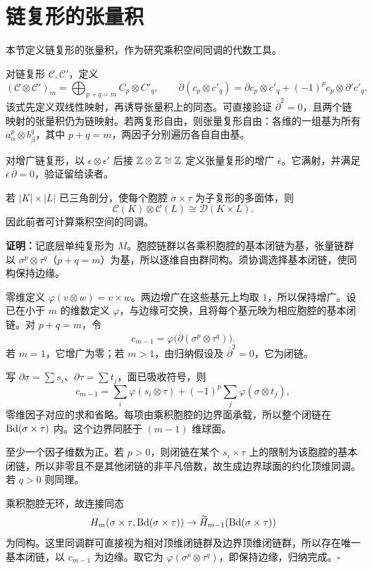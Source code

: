 \section{链复形的张量积}
本节定义链复形的张量积，作为研究乘积空间同调的代数工具。

对链复形 $\mathcal C,\mathcal C'$，定义
\[
(\mathcal C\otimes\mathcal C')_m=\bigoplus_{p+q=m}C_p\otimes C'_q,
\qquad
\overline\partial(c_p\otimes c'_q)=\partial c_p\otimes c'_q+(-1)^pc_p\otimes\partial'c'_q.
\]
该式先定义双线性映射，再诱导张量积上的同态。可直接验证 $\overline\partial^2=0$，且两个链映射的张量积仍为链映射。若两复形自由，则张量复形自由：各维的一组基为所有 $a_\alpha^p\otimes b_\beta^q$，其中 $p+q=m$，两因子分别遍历各自自由基。

对增广链复形，以 $\epsilon\otimes\epsilon'$ 后接 $\mathbb{Z}\otimes\mathbb{Z}\cong\mathbb{Z}$ 定义张量复形的增广 $\overline\epsilon$。它满射，并满足 $\overline\epsilon\,\overline\partial=0$，验证留给读者。

若 $|K|\times|L|$ 已三角剖分，使每个胞腔 $\sigma\times\tau$ 为子复形的多面体，则
\[
\mathcal C(K)\otimes\mathcal C(L)\cong\mathcal D(K\times L).
\]
因此前者可计算乘积空间的同调。

\textbf{证明：}记底层单纯复形为 $M$。胞腔链群以各乘积胞腔的基本闭链为基，张量链群以 $\sigma^p\otimes\tau^q$（$p+q=m$）为基，所以逐维自由群同构。须协调选择基本闭链，使同构保持边缘。

零维定义 $\varphi(v\otimes w)=v\times w$。两边增广在这些基元上均取 $1$，所以保持增广。设已在小于 $m$ 的维数定义 $\varphi$，与边缘可交换，且将每个基元映为相应胞腔的基本闭链。对 $p+q=m$，令
\[
c_{m-1}=\varphi\bigl(\overline\partial(\sigma^p\otimes\tau^q)\bigr).
\]
若 $m=1$，它增广为零；若 $m>1$，由归纳假设及 $\overline\partial^2=0$，它为闭链。

写 $\partial\sigma=\sum s_i$、$\partial\tau=\sum t_j$，面已吸收符号，则
\[
c_{m-1}=\sum_i\varphi(s_i\otimes\tau)+(-1)^p\sum_j\varphi(\sigma\otimes t_j),
\]
零维因子对应的求和省略。每项由乘积胞腔的边界面承载，所以整个闭链在 $\operatorname{Bd}(\sigma\times\tau)$ 内。这个边界同胚于 $(m-1)$ 维球面。

至少一个因子维数为正。若 $p>0$，则闭链在某个 $s_i\times\tau$ 上的限制为该胞腔的基本闭链，所以非零且不是其他闭链的非平凡倍数，故生成边界球面的约化顶维同调。若 $q>0$ 则同理。

乘积胞腔无环，故连接同态
\[
H_m(\sigma\times\tau,\operatorname{Bd}(\sigma\times\tau))\to\widetilde H_{m-1}(\operatorname{Bd}(\sigma\times\tau))
\]
为同构。这里同调群可直接视为相对顶维闭链群及边界顶维闭链群，所以存在唯一基本闭链，以 $c_{m-1}$ 为边缘。取它为 $\varphi(\sigma^p\otimes\tau^q)$，即保持边缘，归纳完成。\hfill$\square$

